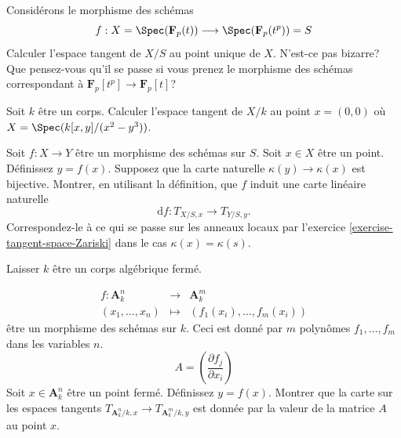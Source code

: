 \begin{exercise}
\label{exercise-compute-TS-field}
Considérons le morphisme des schémas
$$
f : X = \Spec(\mathbf{F}_p(t))
\longrightarrow
\Spec(\mathbf{F}_p(t^p)) = S
$$
Calculer l'espace tangent de $X/S$ au point unique de
$X$. N'est-ce pas bizarre? Que pensez-vous qu'il se passe si vous
prenez le morphisme des schémas correspondant à $\mathbf{F}_p[t^p] \to \mathbf{F}_p[t]$?
\end{exercise}

\begin{exercise}
\label{exercise-compute-TS-cusp}
Soit $k$ être un
corps. Calculer l'espace tangent de $X/k$ au point $x = (0,
0)$ où $X = \Spec(k[x, y]/(x^2 - y^3))$.
\end{exercise}

\begin{exercise}
\label{exercise-map-tangent-spaces}
Soit $f : X \to Y$ être un morphisme des schémas
sur $S$. Soit $x \in X$ être un
point. Définissez $y = f(x)$. Supposez que la carte naturelle $\kappa(y) \to
\kappa(x)$ est bijective. Montrer, en utilisant la
définition, que $f$ induit une carte linéaire naturelle
$$
\text{d}f : T_{X/S, x} \longrightarrow T_{Y/S, y}.
$$
Correspondez-le à ce qui se passe sur
les anneaux locaux par l'exercice \ref{exercise-tangent-space-Zariski} dans le cas $\kappa(x) = \kappa(s)$.
\end{exercise}

\begin{exercise}
\label{exercise-Jacobian}
Laisser $k$ être un corps algébrique fermé.

\begin{eqnarray*}
f : \mathbf{A}_k^n & \longrightarrow & \mathbf{A}^m_k \\
(x_1, \ldots, x_n) & \longmapsto & (f_1(x_i), \ldots, f_m(x_i))
\end{eqnarray*}
être un morphisme des schémas sur $k$. Ceci
est donné par $m$ polynômes $f_1, \ldots, f_m$ dans
les variables $n$.
$$
A = \left( \frac{\partial f_j}{\partial x_i} \right)
$$
Soit $x \in \mathbf{A}^n_k$ être un point fermé.
Définissez $y = f(x)$. Montrer que la carte sur
les espaces tangents $T_{\mathbf{A}^n_k/k, x} \to T_{\mathbf{A}^m_k/k, y}$ est donnée
par la valeur de la matrice $A$ au point $x$.
\end{exercise}














